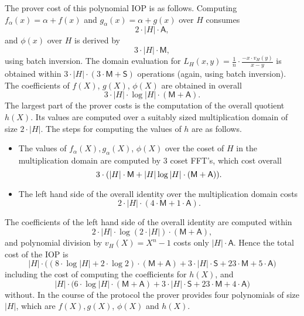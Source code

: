 \documentclass[11pt]{article}
\theoremstyle{definition}
\theoremstyle{remark}
\begin{document}
The prover cost of this polynomial IOP is as follows.
Computing $f_\alpha(x) = \alpha + f(x)$ and $g_\alpha(x) = \alpha + g(x)$ over $H$ consumes 
\[
2\cdot |H|\cdot \mathsf A,
\]
and $\phi(x)$ over $H$ is derived by  
\[
3\cdot |H|\cdot \mathsf M,
\] 
using batch inversion. 
The domain evaluation for $L_H(x, y) = \frac{1}{n}\cdot \frac{- x \cdot v_H(y)}{x- y}$ is obtained within $3\cdot |H|\cdot (3\cdot \mathsf M + \mathsf S)$ operations (again, using batch inversion).
The coefficients of $f(X)$, $g(X)$, $\phi(X)$ are obtained in overall  
\[
3\cdot |H|\cdot \log|H|\cdot (\mathsf M + \mathsf A).
\] 
The largest part of the prover costs is the computation of the overall quotient $h(X)$.
Its values are computed over a suitably sized multiplication domain of size $2\cdot |H|$.
The steps for computing the values of $h$ are as follows.
%
\begin{itemize}
\item 
The values of $f_\alpha(X), g_\alpha(X)$, $\phi(X)$ over the coset of $H$ in the multiplication domain are computed by $3$ coset FFT's, which cost overall
\[
3\cdot ( |H| \cdot \textsf M + |H|\log|H|\cdot (\mathsf M + \mathsf A)).
\] 
\item
The left hand side of the overall identity over the multiplication domain costs 
\[
2\cdot |H|\cdot (4 \cdot\mathsf M + 1\cdot \mathsf A).
\]
\end{itemize}
The coefficients of the left hand side of the overall identity are computed within
\[
2\cdot |H| \cdot \log(2\cdot |H|)\cdot (\mathsf M + \mathsf A),
\]
and polynomial division by $v_H(X)= X^n - 1$ costs only $|H|\cdot \mathsf A$.
Hence the total cost of the IOP is 
\begin{equation}
\label{e:uv:pa:cost}
|H|\cdot  \big((8\cdot \log |H| + 2\cdot \log 2 ) \cdot (\mathsf M + \mathsf A) + 3\cdot |H|\cdot\mathsf S +  23\cdot \mathsf M + 5\cdot \mathsf A\big)
\end{equation}
including the cost of computing the coefficients for $h(X)$, and 
\begin{equation}
\label{e:UV:lookup:cost:without:h}
|H|\cdot  \big( 6\cdot \log |H|   \cdot (\mathsf M + \mathsf A) + 3\cdot |H|\cdot\mathsf S +  23\cdot \mathsf M + 4\cdot\mathsf A \big)
\end{equation}
without.
In the course of the protocol the prover provides four polynomials of size $|H|$, which are $f(X), g(X)$, $\phi(X)$ and $h(X)$.
\end{document}
